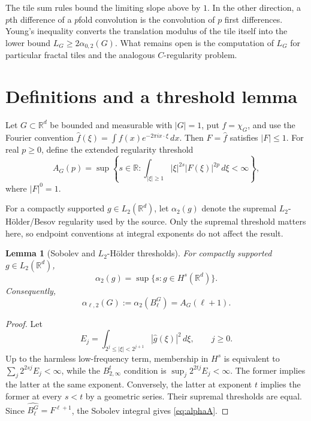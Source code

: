 \documentclass[11pt]{article}
\newtheorem{lemma}[theorem]{Lemma}
\theoremstyle{remark}
\newcommand{\R}{\mathbb R}
\newcommand{\wh}{\widehat}
\newcommand{\dd}{\,d}
\begin{document}
The tile sum rules bound the limiting slope above by $1$.  In the other
direction, a $p$th difference of a $p$fold convolution is the convolution of
$p$ first differences.  Young's inequality converts the translation modulus
of the tile itself into the lower bound $L_G\ge2\alpha_{0,2}(G)$.  What remains
open is the computation of $L_G$ for particular fractal tiles and the analogous
$C$-regularity problem.

\section{Definitions and a threshold lemma}

Let $G\subset\R^d$ be bounded and measurable with $|G|=1$, put
$f=\chi_G$, and use the Fourier convention
\(
\wh f(\xi)=\int f(x)e^{-2\pi i x\cdot\xi}\dd x.
\)
Then $F=\wh f$ satisfies $|F|\le1$.  For real $p\ge0$, define the extended
regularity threshold
\begin{equation}\label{eq:Adef}
 A_G(p)=\sup\left\{s\in\R:
 \int_{|\xi|\ge1}|\xi|^{2s}|F(\xi)|^{2p}\dd\xi<\infty\right\},
\end{equation}
where $|F|^0=1$.

For a compactly supported $g\in L_2(\R^d)$, let
\(\alpha_2(g)\) denote the supremal $L_2$-H\"older/Besov regularity used by
the source.  Only the supremal threshold matters here, so endpoint conventions
at integral exponents do not affect the result.

\begin{lemma}[Sobolev and $L_2$-H\"older thresholds]\label{lem:threshold}
For compactly supported $g\in L_2(\R^d)$,
\[
 \alpha_2(g)=\sup\{s:g\in H^s(\R^d)\}.
\]
Consequently,
\begin{equation}\label{eq:alphaA}
 \alpha_{\ell,2}(G):=\alpha_2(B_\ell^G)=A_G(\ell+1).
\end{equation}
\end{lemma}

\begin{proof}
Let
\[
 E_j=\int_{2^j\le|\xi|<2^{j+1}}|\wh g(\xi)|^2\dd\xi,
 \qquad j\ge0.
\]
Up to the harmless low-frequency term, membership in $H^s$ is equivalent to
\(\sum_j2^{2sj}E_j<\infty\), while the $B^t_{2,\infty}$ condition is
\(\sup_j2^{2tj}E_j<\infty\).  The former implies the latter at the same
exponent.  Conversely, the latter at exponent $t$ implies the former at every
$s<t$ by a geometric series.  Their supremal thresholds are equal.  Since
\(\wh{B_\ell^G}=F^{\ell+1}\), the Sobolev integral gives
\eqref{eq:alphaA}.
\end{proof}
\end{document}
